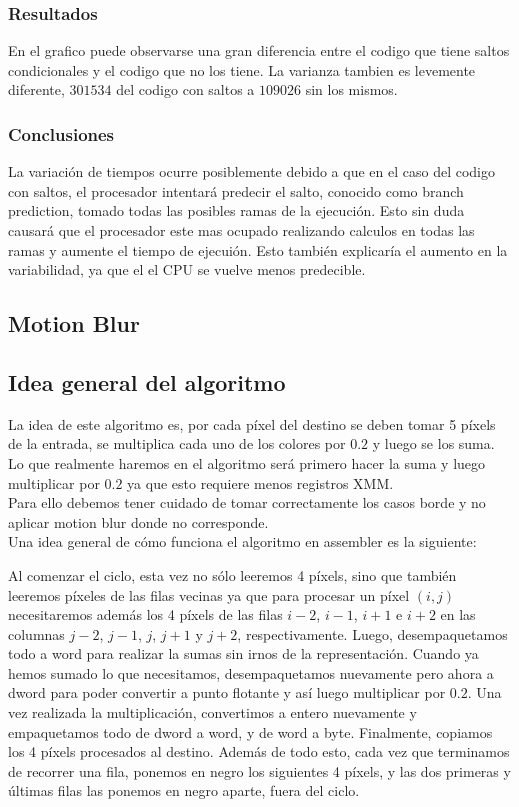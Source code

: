 \documentclass[a4paper]{article}
\begin{document}
\subsubsection{Resultados}
En el grafico puede observarse una gran diferencia entre el codigo que tiene saltos condicionales y el codigo que no los tiene. La varianza tambien es levemente diferente, $301534$ del codigo con saltos a $109026$ sin los mismos.

\subsubsection{Conclusiones}

La variación de tiempos ocurre posiblemente debido a que en el caso del codigo con saltos, el procesador intentará predecir el salto, conocido como branch prediction, tomado todas las posibles ramas de la ejecución. Esto sin duda causará que el procesador este mas ocupado realizando calculos en todas las ramas y aumente el tiempo de ejecuión. Esto también explicaría el aumento en la variabilidad, ya que el el CPU se vuelve menos predecible.

\newpage
\subsection{Motion Blur}
\subsection{Idea general del algoritmo}
La idea de este algoritmo es, por cada píxel del destino se deben tomar 5 píxels de la entrada, se multiplica cada uno de los colores por $0.2$ y luego se los suma. Lo que realmente haremos en el algoritmo será primero hacer la suma y luego multiplicar por $0.2$ ya que esto requiere menos registros XMM.
\\
Para ello debemos tener cuidado de tomar correctamente los casos borde y no aplicar motion blur donde no corresponde.
\\
Una idea general de cómo funciona el algoritmo en assembler es la siguiente:

Al comenzar el ciclo, esta vez no sólo leeremos 4 píxels, sino que también leeremos píxeles de las filas vecinas ya que para procesar un píxel $(i,j)$ necesitaremos además los 4 píxels de las filas $i-2$, $i-1$, $i+1$ e $i+2$ en las columnas $j-2$, $j-1$, $j$, $j+1$ y $j+2$, respectivamente. Luego, desempaquetamos todo a word para realizar la sumas sin irnos de la representación. Cuando ya hemos sumado lo que necesitamos, desempaquetamos nuevamente pero ahora a dword para poder convertir a punto flotante y así luego multiplicar por $0.2$. Una vez realizada la multiplicación, convertimos a entero nuevamente y empaquetamos todo de dword a word, y de word a byte. Finalmente, copiamos los 4 píxels procesados al destino. Además de todo esto, cada vez que terminamos de recorrer una fila, ponemos en negro los siguientes 4 píxels, y las dos primeras y últimas filas las ponemos en negro aparte, fuera del ciclo.
\end{document}
